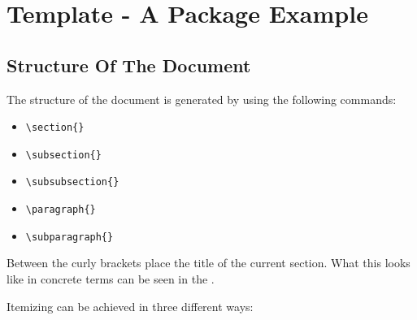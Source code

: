 
\section {Template - A Package Example}

\subsection {Structure Of The Document}

The structure of the document is generated by using the following commands:
\begin{itemize}
\item \verb*?\section{}?
\item \verb*?\subsection{}?
\item \verb*?\subsubsection{}?
\item \verb*?\paragraph{}?
\item \verb*?\subparagraph{}?
\end{itemize}

Between the curly brackets place the title of the current
section. What this looks like in concrete terms can be seen in
the .

Itemizing can be achieved in three different ways:

